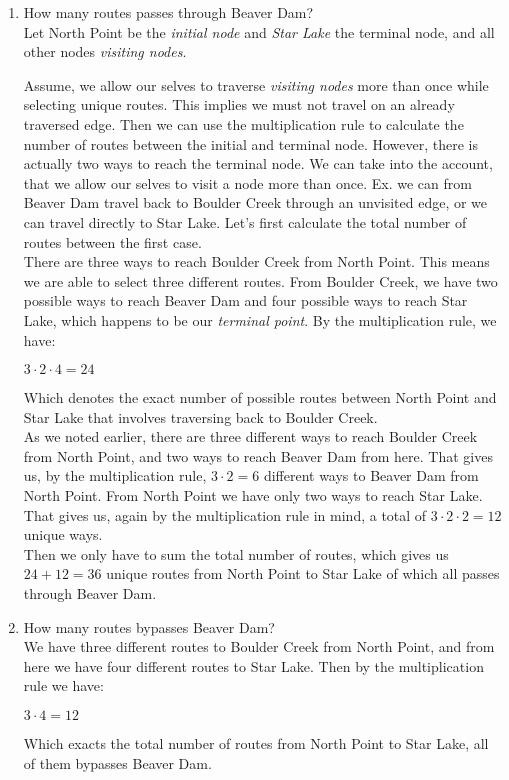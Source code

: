 \documentclass{report}
\newcommand{\cent}[1]{\begin{center}#1\end{center}}
\newcommand{\defaultEnumerateLabel}{\textbf{\alph*.}}
\newcommand{\myItem}[1]{\item #1\\}
\begin{document}
 	\begin{enumerate}[label=\defaultEnumerateLabel]
 		\myItem{How many routes passes through Beaver Dam?}
 		
 		Let North Point be the \textit{initial node} and \textit{Star Lake} the terminal node, and all other nodes \textit{visiting nodes}.
 		
 		Assume, we allow our selves to traverse \textit{visiting nodes} more than once while selecting unique routes. This implies we must not travel on an already traversed edge. Then we can use the multiplication rule to calculate the number of routes between the initial and terminal node. However, there is actually two ways to reach the terminal node. We can take into the account, that we allow our selves to visit a node more than once. Ex. we can from Beaver Dam travel back to Boulder Creek through an unvisited edge, or we can travel directly to Star Lake. Let's first calculate the total number of routes between the first case. \\
 		
 		There are three ways to reach Boulder Creek from North Point. This means we are able to select three different routes. From Boulder Creek, we have two possible ways to reach Beaver Dam and four possible ways to reach Star Lake, which happens to be our \textit{terminal point}. By the multiplication rule, we have:
 		\cent{$3 \cdot 2 \cdot 4 = 24$}
 		
 		Which denotes the exact number of possible routes between North Point and Star Lake that involves traversing back to Boulder Creek.\\
 		
 		As we noted earlier, there are three different ways to reach Boulder Creek from North Point, and two ways to reach Beaver Dam from here. That gives us, by the multiplication rule, $3 \cdot 2 = 6$ different ways to Beaver Dam from North Point. From North Point we have only two ways to reach Star Lake. That gives us, again by the multiplication rule in mind, a total of $3 \cdot 2 \cdot 2 = 12$ unique ways.\\
 		
 		Then we only have to sum the total number of routes, which gives us $24 + 12 = 36$ unique routes from North Point to Star Lake of which all passes through Beaver Dam.\\
 		
 		\myItem{How many routes bypasses Beaver Dam?}
 		
 		We have three different routes to Boulder Creek from North Point, and from here we have four different routes to Star Lake. Then by the multiplication rule we have:
 		
 		\cent{$3 \cdot 4 = 12$}
 		
 		Which exacts the total number of routes from North Point to Star Lake, all of them bypasses Beaver Dam.\\
 		
 	\end{enumerate}
 	
\end{document}
